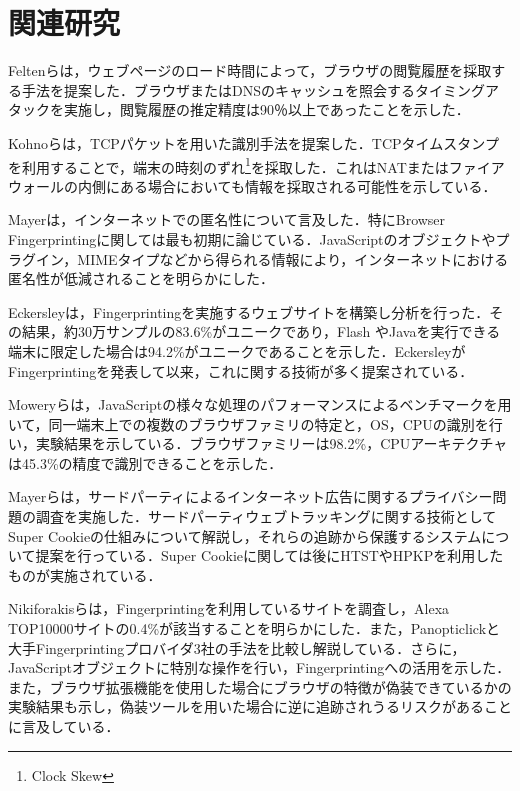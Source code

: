 \newpage
\section{関連研究}
Feltenら\cite{felten2000timing}は，ウェブページのロード時間によって，ブラウザの閲覧履歴を採取する手法を提案した．ブラウザまたはDNSのキャッシュを照会するタイミングアタックを実施し，閲覧履歴の推定精度は90％以上であったことを示した．

Kohnoら\cite{kohno2005remote}は，TCPパケットを用いた識別手法を提案した．TCPタイムスタンプを利用することで，端末の時刻のずれ\footnote{Clock Skew}を採取した．これはNATまたはファイアウォールの内側にある場合においても情報を採取される可能性を示している．

Mayer\cite{mayer2009any}は，インターネットでの匿名性について言及した．特にBrowser Fingerprintingに関しては最も初期に論じている．JavaScriptのオブジェクトやプラグイン，MIMEタイプなどから得られる情報により，インターネットにおける匿名性が低減されることを明らかにした．

Eckersley\cite{eckersley2010unique}は，Fingerprintingを実施するウェブサイトを構築し分析を行った．その結果，約30万サンプルの83.6\%がユニークであり，Flash やJavaを実行できる端末に限定した場合は94.2\%がユニークであることを示した．EckersleyがFingerprintingを発表して以来，これに関する技術が多く提案されている．

Moweryら\cite{mowery2011fingerprinting}は，JavaScriptの様々な処理のパフォーマンスによるベンチマークを用いて，同一端末上での複数のブラウザファミリの特定と，OS，CPUの識別を行い，実験結果を示している．ブラウザファミリーは98.2\%，CPUアーキテクチャは45.3\%の精度で識別できることを示した．

Mayerら\cite{mayer2012third}は，サードパーティによるインターネット広告に関するプライバシー問題の調査を実施した．サードパーティウェブトラッキングに関する技術としてSuper Cookieの仕組みについて解説し，それらの追跡から保護するシステムについて提案を行っている．Super Cookieに関しては後にHTST\cite{hsts}やHPKP\cite{hpkp}を利用したものが実施されている．

Nikiforakisら\cite{nikiforakis2013cookieless}は，Fingerprintingを利用しているサイトを調査し，Alexa TOP10000サイトの0.4\%が該当することを明らかにした．また，Panopticlickと大手Fingerprintingプロバイダ3社の手法を比較し解説している．さらに，JavaScriptオブジェクトに特別な操作を行い，Fingerprintingへの活用を示した．また，ブラウザ拡張機能を使用した場合にブラウザの特徴が偽装できているかの実験結果も示し，偽装ツールを用いた場合に逆に追跡されうるリスクがあることに言及している．

